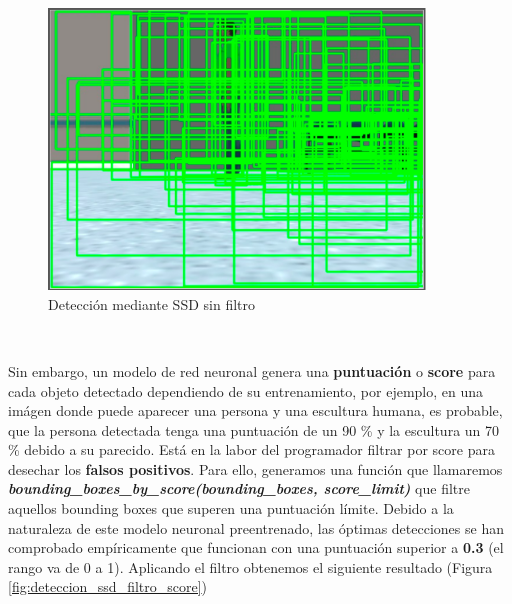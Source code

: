 \begin{figure} [H]
  \begin{center}
    \includegraphics[width=10cm]{imagenes/deteccion-ssd-sin-filtro.png}
  \end{center}
  \caption[Detección mediante SSD sin filtro]{Detección mediante SSD sin filtro}
  \label{fig:deteccion_ssd_sin_filtro}
\end{figure}\

Sin embargo, un modelo de red neuronal genera una \textbf{puntuación} o \textbf{score} para cada objeto detectado dependiendo de su entrenamiento, por ejemplo, en una imágen donde puede aparecer una persona y una escultura humana, es probable, que la persona detectada tenga una puntuación de un 90 \% y la escultura un 70 \% debido a su parecido. Está en la labor del programador filtrar por score para desechar los \textbf{falsos positivos}. Para ello, generamos una función que llamaremos \textbf{\textit{bounding\_boxes\_by\_score(bounding\_boxes, score\_limit)}} que filtre aquellos bounding boxes que superen una puntuación límite. Debido a la naturaleza de este modelo neuronal preentrenado, las óptimas detecciones se han comprobado empíricamente que funcionan con una puntuación superior a \textbf{0.3} (el rango va de 0 a 1). Aplicando el filtro obtenemos el siguiente resultado (Figura \ref{fig:deteccion_ssd_filtro_score})\\

